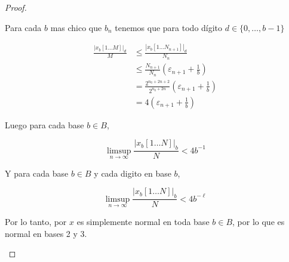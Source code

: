 \documentclass{article}
\theoremstyle{definition} %
\begin{document}
\begin{proof}
\begin{itemize}
        Para cada $b$ mas chico que $b_n$ tenemos que para todo dígito $d \in
        \{0, \dots, b - 1\}$

        \begin{align*}
            \frac{|x_b[1\dots M]|_d}{M} 
                &\leq \frac{|x_b[1\dots N_{n+1}]|_d}{N_n} \\
                &\leq \frac{N_{n+1}}{N_n}\left(\varepsilon_{n+1} + \frac{1}{b}\right)\\
                &=\frac{2^{n_0 + 2n + 2}}{2^{n_0 + 2n}}
                    \left(\varepsilon_{n+1} + \frac{1}{b}\right)\\
                &=4\left(\varepsilon_{n+1} + \frac{1}{b}\right)
        \end{align*}

        Luego para cada base $b \in B$,

        $$\limsup_{n\to\infty} \frac{|x_b[1\dots N]|_b}{N} < 4 b^{-1}$$

        Y para cada base $b \in B$ y cada digito en base $b$,

        $$\limsup_{n\to\infty} \frac{|x_b[1\dots N]|_b}{N} < 4 b^{-\ell}$$

        Por lo tanto, por  $x$ es simplemente
        normal en toda base $b \in B$, por lo que es normal en bases 2 y 3.
    \end{itemize}
\end{proof}
\end{document}
